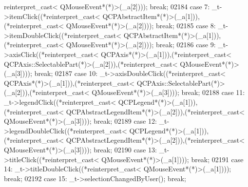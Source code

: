 \begin{DoxyCode}
{      reinterpret\_cast<} QMouseEvent*(*)\textcolor{keyword}{>}(\_a[2]))); \textcolor{keywordflow}{break};
02184         \textcolor{keywordflow}{case} 7: \_t->itemClick((*\textcolor{keyword}{reinterpret\_cast<} QCPAbstractItem*(*)\textcolor{keyword}{>}(\_a[1])),(*\textcolor{keyword}{reinterpret\_cast<} 
      QMouseEvent*(*)\textcolor{keyword}{>}(\_a[2]))); \textcolor{keywordflow}{break};
02185         \textcolor{keywordflow}{case} 8: \_t->itemDoubleClick((*\textcolor{keyword}{reinterpret\_cast<} QCPAbstractItem*(*)\textcolor{keyword}{>}(\_a[1])),(*\textcolor{keyword}{reinterpret\_cast<} 
      QMouseEvent*(*)\textcolor{keyword}{>}(\_a[2]))); \textcolor{keywordflow}{break};
02186         \textcolor{keywordflow}{case} 9: \_t->axisClick((*\textcolor{keyword}{reinterpret\_cast<} QCPAxis*(*)\textcolor{keyword}{>}(\_a[1])),(*\textcolor{keyword}{reinterpret\_cast<} 
      QCPAxis::SelectablePart(*)\textcolor{keyword}{>}(\_a[2])),(*\textcolor{keyword}{reinterpret\_cast<} QMouseEvent*(*)\textcolor{keyword}{>}(\_a[3]))); \textcolor{keywordflow}{break};
02187         \textcolor{keywordflow}{case} 10: \_t->axisDoubleClick((*\textcolor{keyword}{reinterpret\_cast<} QCPAxis*(*)\textcolor{keyword}{>}(\_a[1])),(*\textcolor{keyword}{reinterpret\_cast<} 
      QCPAxis::SelectablePart(*)\textcolor{keyword}{>}(\_a[2])),(*\textcolor{keyword}{reinterpret\_cast<} QMouseEvent*(*)\textcolor{keyword}{>}(\_a[3]))); \textcolor{keywordflow}{break};
02188         \textcolor{keywordflow}{case} 11: \_t->legendClick((*\textcolor{keyword}{reinterpret\_cast<} QCPLegend*(*)\textcolor{keyword}{>}(\_a[1])),(*\textcolor{keyword}{reinterpret\_cast<} 
      QCPAbstractLegendItem*(*)\textcolor{keyword}{>}(\_a[2])),(*\textcolor{keyword}{reinterpret\_cast<} QMouseEvent*(*)\textcolor{keyword}{>}(\_a[3]))); \textcolor{keywordflow}{break};
02189         \textcolor{keywordflow}{case} 12: \_t->legendDoubleClick((*\textcolor{keyword}{reinterpret\_cast<} QCPLegend*(*)\textcolor{keyword}{>}(\_a[1])),(*\textcolor{keyword}{reinterpret\_cast<} 
      QCPAbstractLegendItem*(*)\textcolor{keyword}{>}(\_a[2])),(*\textcolor{keyword}{reinterpret\_cast<} QMouseEvent*(*)\textcolor{keyword}{>}(\_a[3]))); \textcolor{keywordflow}{break};
02190         \textcolor{keywordflow}{case} 13: \_t->titleClick((*\textcolor{keyword}{reinterpret\_cast<} QMouseEvent*(*)\textcolor{keyword}{>}(\_a[1]))); \textcolor{keywordflow}{break};
02191         \textcolor{keywordflow}{case} 14: \_t->titleDoubleClick((*\textcolor{keyword}{reinterpret\_cast<} QMouseEvent*(*)\textcolor{keyword}{>}(\_a[1]))); \textcolor{keywordflow}{break};
02192         \textcolor{keywordflow}{case} 15: \_t->selectionChangedByUser(); \textcolor{keywordflow}{break};

\end{DoxyCode}
